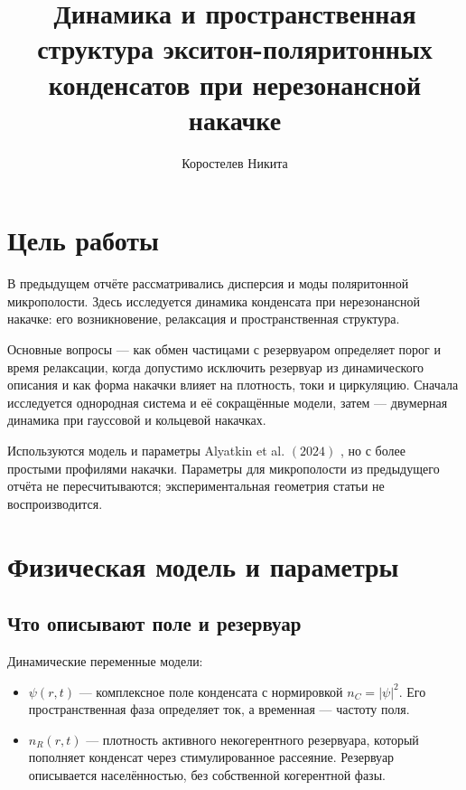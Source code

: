 \documentclass[12pt,a4paper]{article}
\title{Динамика и пространственная структура экситон-поляритонных конденсатов при нерезонансной накачке}
\author{Коростелев Никита}
\date{}
\begin{document}
\maketitle
\clearpage

\section{Цель работы}\label{sec:1}

В предыдущем отчёте рассматривались дисперсия и моды поляритонной микрополости. Здесь исследуется динамика конденсата при нерезонансной накачке: его возникновение, релаксация и пространственная структура.

Основные вопросы --- как обмен частицами с резервуаром определяет порог и время релаксации, когда допустимо исключить резервуар из динамического описания и как форма накачки влияет на плотность, токи и циркуляцию. Сначала исследуется однородная система и её сокращённые модели, затем --- двумерная динамика при гауссовой и кольцевой накачках.

Используются модель и параметры Alyatkin et al. $(2024)$ \cite{ref3}, но с более простыми профилями накачки. Параметры для микрополости из предыдущего отчёта не пересчитываются; экспериментальная геометрия статьи \cite{ref3} не воспроизводится.

\clearpage

\section{Физическая модель и параметры}\label{sec:2}

\subsection{Что описывают поле и резервуар}\label{sec:2.1}

Динамические переменные модели:

\begin{itemize}\raggedright\setlength{\itemsep}{3pt}\setlength{\parsep}{0pt}

\item $\psi(r,t)$ --- комплексное поле конденсата с нормировкой $n_{C}=|\psi|^{2}$. Его пространственная фаза определяет ток, а временная --- частоту поля.

\item $n_{R}(r,t)$ --- плотность активного некогерентного резервуара, который пополняет конденсат через стимулированное рассеяние. Резервуар описывается населённостью, без собственной когерентной фазы.

\end{itemize}
\end{document}
